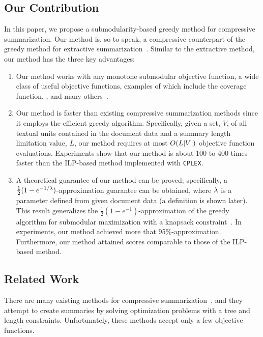 \documentclass[11pt,a4paper]{article}
\begin{document}
	\subsection{Our Contribution}
	In this paper, 
	we propose a submodularity-based greedy method 
	for compressive summarization.  
	Our method is, so to speak, a compressive counterpart 
	of the greedy method for extractive summarization~\cite{lin2010multi}. 
	Similar to the extractive method, 
	our method has the three key advantages: 
	\begin{enumerate}
		\item 
		Our method works with 
		any {monotone submodular} objective function, 
		a wide class of useful objective functions,      
		examples of which include 
		the coverage function, \rouge, 
		and many others~\cite{lin2011class,jkurisinkel-EtAl:2016:N16-2}. 
		\item 
		Our method is faster than  existing 
		compressive summarization methods since it employs 
		the efficient greedy algorithm. 
		Specifically, 
		given a set, $V$, 
		of all textual units contained in the document data  
		and a summary length limitation value, $L$,   
		our method requires at most $O(L|V|)$ objective 
		function evaluations. 
		Experiments show that our method is 
		about 100 to 400 times faster than 
		the ILP-based method implemented with {\tt CPLEX}. 	
		\item 
		A theoretical guarantee of our method can be proved; 
		specifically, 
		a $\frac{1}{2}(1-e^{-1/\lambda})$-approximation guarantee can be obtained, 
		where $\lambda$ is a parameter defined from given document data (a definition is shown later). 
		This result generalizes 
		the $\frac{1}{2}(1-e^{-1})$-approximation of the greedy 
		algorithm for submodular maximization 
		with a knapsack constraint~\cite{leskovec2007cost}. 
		In experiments, 
		our method achieved more that 95\%-approximation. 
		Furthermore, our method attained  scores comparable to those of the ILP-based method.  
	\end{enumerate}  
	
	
	
	\subsection{Related Work}
	There are many existing methods for compressive summarization~\cite{berg2011jointly,almeida2013fast,morita2013subtree,kikuchi2014single,hirao2017oracle}, 
	and they attempt to create summaries by solving optimization problems with 
	a tree and length constraints. 
	Unfortunately, these methods accept only a few objective functions. 
	
\end{document}
